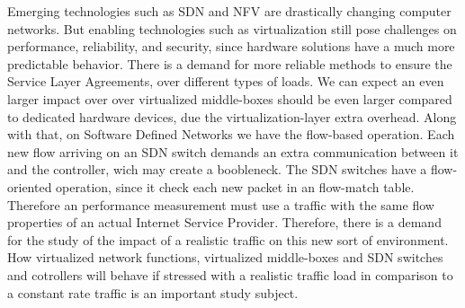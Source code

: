 Emerging technologies such as SDN and NFV are  drastically changing  computer networks. But enabling technologies such as virtualization still pose challenges on performance,  reliability, and security\cite{nfv-challenges}, since hardware solutions  have a much more predictable behavior. There is a demand for more reliable methods to ensure the Service Layer Agreements, over different types of loads. We can expect an even larger impact over over virtualized middle-boxes should be even larger compared to dedicated hardware devices, due the virtualization-layer extra overhead. Along with that, on Software Defined Networks we have the flow-based operation\cite{sdn-survey}. Each new flow arriving on an SDN switch demands an extra communication between it and the controller, wich may create a boobleneck. The SDN switches have a flow-oriented operation, since it check each new packet in an flow-match table. Therefore an performance measurement must use a traffic with the same flow properties of an actual Internet Service Provider. Therefore, there is a demand for the study of the impact of a realistic traffic on this new sort of environment. How virtualized network functions,  virtualized middle-boxes and SDN switches and cotrollers will behave if stressed with a realistic traffic load in comparison to a constant rate traffic is an important study subject. 


